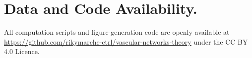 
\section{Data and Code Availability.}
All computation scripts and figure-generation code are openly available at
\url{https://github.com/rikymarche-ctrl/vascular-networks-theory} under the CC
BY 4.0 Licence.
